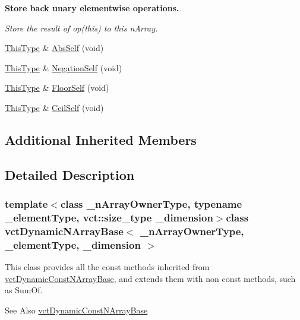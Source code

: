 \begin{Indent}{\bf Store back unary elementwise operations.}\par
{\em Store the result of op(this) to this n\-Array. }\begin{DoxyCompactItemize}
\item 
\hyperlink{classvct_dynamic_const_n_array_base_a5123caffcf1455a1b99003877eade897}{This\-Type} \& \hyperlink{classvct_dynamic_n_array_base_a6ea5477d6846af43ed0ab43edf85d950}{Abs\-Self} (void)
\item 
\hyperlink{classvct_dynamic_const_n_array_base_a5123caffcf1455a1b99003877eade897}{This\-Type} \& \hyperlink{classvct_dynamic_n_array_base_a51cef4d991f6da98e391718e84378917}{Negation\-Self} (void)
\item 
\hyperlink{classvct_dynamic_const_n_array_base_a5123caffcf1455a1b99003877eade897}{This\-Type} \& \hyperlink{classvct_dynamic_n_array_base_a553090c1ad16724aedc7a68408a7d803}{Floor\-Self} (void)
\item 
\hyperlink{classvct_dynamic_const_n_array_base_a5123caffcf1455a1b99003877eade897}{This\-Type} \& \hyperlink{classvct_dynamic_n_array_base_ac34ee1150c9263720e7b8cfd60e9d42c}{Ceil\-Self} (void)
\end{DoxyCompactItemize}
\end{Indent}
\subsection*{Additional Inherited Members}


\subsection{Detailed Description}
\subsubsection*{template$<$class \-\_\-n\-Array\-Owner\-Type, typename \-\_\-element\-Type, vct\-::size\-\_\-type \-\_\-dimension$>$class vct\-Dynamic\-N\-Array\-Base$<$ \-\_\-n\-Array\-Owner\-Type, \-\_\-element\-Type, \-\_\-dimension $>$}

This class provides all the const methods inherited from \hyperlink{classvct_dynamic_const_n_array_base}{vct\-Dynamic\-Const\-N\-Array\-Base}, and extends them with non const methods, such as Sum\-Of.

\begin{DoxySeeAlso}{See Also}
\hyperlink{classvct_dynamic_const_n_array_base}{vct\-Dynamic\-Const\-N\-Array\-Base} 
\end{DoxySeeAlso}


